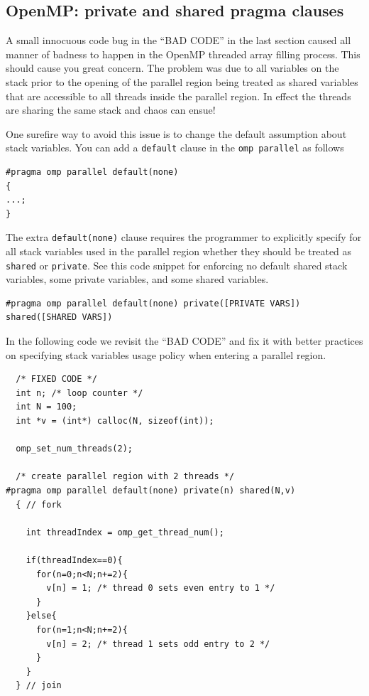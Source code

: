 \subsection{OpenMP: private and shared pragma clauses}

A small innocuous code bug in the ``BAD CODE'' in the last section caused all manner of badness to happen in the OpenMP threaded array filling process. This should cause you great concern. The problem was due to all variables on the stack prior to the opening of the parallel region being treated as shared variables that are accessible to all threads inside the parallel region. In effect the threads are sharing the same stack and chaos can ensue!

One surefire way to avoid this issue is to change the default assumption about stack variables. You can add a \texttt{default} clause in the \texttt{omp parallel} as follows

\begin{verbatim}
#pragma omp parallel default(none)
{
...;
}
\end{verbatim}

The extra \texttt{default(none)} clause requires the programmer to explicitly specify for all stack variables used in the parallel region whether they should be treated as \texttt{shared} or \texttt{private}. See this code snippet for enforcing no default shared stack variables, some private variables, and some shared variables. 

\begin{verbatim}
#pragma omp parallel default(none) private([PRIVATE VARS]) shared([SHARED VARS])
\end{verbatim}

In the following code we revisit the ``BAD CODE'' and fix it with better practices on specifying stack variables usage policy when entering a parallel region.

\begin{verbatim}
  /* FIXED CODE */
  int n; /* loop counter */
  int N = 100;
  int *v = (int*) calloc(N, sizeof(int));

  omp_set_num_threads(2);

  /* create parallel region with 2 threads */
#pragma omp parallel default(none) private(n) shared(N,v)
  { // fork
  
    int threadIndex = omp_get_thread_num();

    if(threadIndex==0){
      for(n=0;n<N;n+=2){
        v[n] = 1; /* thread 0 sets even entry to 1 */
      }
    }else{
      for(n=1;n<N;n+=2){
        v[n] = 2; /* thread 1 sets odd entry to 2 */
      }
    }
  } // join     
\end{verbatim}

